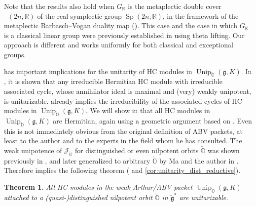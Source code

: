 \documentclass[11pt, a4paper]{amsart}
\newcommand{\J}{\mathcal{J}}
\newcommand{\g}{\mathfrak{g}}
\newcommand{\orb}{\mathbb{O}}
\newcommand{\fg}{\mathfrak{g}}
\newcommand{\ckfg}{{\check{\fg}}}
\newcommand{\ckorb}{\check{\orb}}
\DeclareMathOperator{\AOD}{AOD}
\DeclareMathOperator{\Unip}{Unip}
\DeclareMathOperator{\Mp}{\widetilde{Sp}}
\newcommand{\AODK}{\AOD_K}
\newcommand{\UnipOv}{\Unip_{\ckorb}}
\newcommand{\Sp}{\operatorname{Sp}}
\newcommand{\R}{\mathbb{R}}
\newcommand{\GR}{G_\R}
\newtheorem{Thm}{Theorem}[subsection]
\theoremstyle{definition}
\numberwithin{equation}{section}
\begin{document}
Note that the results also hold when $\GR$ is the metaplectic double cover $\Mp(2n,\R)$ of the real symplectic group $\Sp(2n,\R)$, in the framework of the metaplectic Barbasch--Vogan duality map (\cite{BMSZ:metaplecticBV}). This case and the case in which $\GR$ is a classical linear group were previously established in \cite[Theorem 5.3, (b)]{BMSZ:construction_unitarity} using theta lifting. Our approach is different and works uniformly for both classical and exceptional groups.


 has important implications for the unitarity of HC modules in $\UnipOv(\g, K)$. In \cite[Theorem 5.22]{DMB-Hodge}, it is shown that any irreducible Hermitian HC module with irreducible associated cycle, whose annihilator ideal is maximal and (very) weakly unipotent, is unitarizable.  already implies the irreducibility of the associated cycles of HC modules in $\UnipOv(\g, K)$. 
We will show in  that all HC modules in $\UnipOv(\g, K)$ are Hermitian, again using a geometric argument based on . Even this is not immediately obvious from the original definition of ABV packets, at least to the author and to the experts in the field whom he has consulted. The weak unipotence of $\J_{\ckorb}$ for distinguished or even nilpotent orbits $\ckorb$ was shown previously in \cite[Proposition 5.10]{BV85:unipotent}, and later generalized to arbitrary $\ckorb$ by Ma and the author in \cite[Theorem 2.19]{MaYu:weak_unipotence}. Therefore \cite[Theorem 5.22]{DMB-Hodge} implies the following theorem ( and \cref{cor:unitarity_dist_reductive}).

\begin{Thm} \label{thm:main_unitarity_dist}
	All HC modules in the weak Arthur/ABV packet $\UnipOv(\g, K)$ attached to a (quasi-)distinguished nilpotent orbit $\ckorb$ in $\ckfg^*$ are unitarizable.
\end{Thm}
\end{document}
